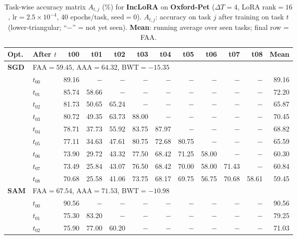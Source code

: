 \begin{table}[ht]
\centering
\caption{%
  Task-wise accuracy matrix $A_{t,j}$ (\%) for \textbf{IncLoRA} on \textbf{Oxford-Pet} ($\Delta T=4$, LoRA rank$=16$, lr$=2.5\times10^{-4}$, 40 epochs/task, seed$=0$).
  $A_{t,j}$: accuracy on task $j$ after training on task $t$  (lower-triangular; ``$-$'' = not yet seen).
  \textbf{Mean}: running average over seen tasks; final row = FAA.
}
\label{tab:raw_inclora_pets}
\setlength{\tabcolsep}{2.8pt}
\renewcommand{\arraystretch}{0.88}
\scriptsize
\begin{tabular}{@{}l l r r r r r r r r r r@{}}
\toprule
\textbf{Opt.} & \textbf{After $t$} & \textbf{t00} & \textbf{t01} & \textbf{t02} & \textbf{t03} & \textbf{t04} & \textbf{t05} & \textbf{t06} & \textbf{t07} & \textbf{t08} & \textbf{Mean} \\
\midrule
\multirow{10}{*}{\textbf{SGD}} & \multicolumn{11}{l}{\quad\small FAA$=59.45$,\; AAA$=64.32$,\; BWT$=-15.35$} \\
 & $t_{00}$ & 89.16 & $-$ & $-$ & $-$ & $-$ & $-$ & $-$ & $-$ & $-$ & 89.16 \\
 & $t_{01}$ & 85.74 & 58.66 & $-$ & $-$ & $-$ & $-$ & $-$ & $-$ & $-$ & 72.20 \\
 & $t_{02}$ & 81.73 & 50.65 & 65.24 & $-$ & $-$ & $-$ & $-$ & $-$ & $-$ & 65.87 \\
 & $t_{03}$ & 80.72 & 49.35 & 63.73 & 88.00 & $-$ & $-$ & $-$ & $-$ & $-$ & 70.45 \\
 & $t_{04}$ & 78.71 & 37.73 & 55.92 & 83.75 & 87.97 & $-$ & $-$ & $-$ & $-$ & 68.82 \\
 & $t_{05}$ & 77.11 & 34.63 & 47.61 & 80.75 & 72.68 & 80.75 & $-$ & $-$ & $-$ & 65.59 \\
 & $t_{06}$ & 73.90 & 29.72 & 43.32 & 77.50 & 68.42 & 71.25 & 58.00 & $-$ & $-$ & 60.30 \\
 & $t_{07}$ & 73.49 & 25.84 & 43.07 & 76.50 & 68.42 & 70.00 & 58.00 & 71.43 & $-$ & 60.84 \\
 & $t_{08}$ & 70.68 & 25.58 & 41.06 & 73.75 & 68.17 & 69.75 & 56.75 & 70.68 & 58.61 & 59.45 \\
\midrule
\multirow{10}{*}{\textbf{SAM}} & \multicolumn{11}{l}{\quad\small FAA$=67.54$,\; AAA$=71.53$,\; BWT$=-10.98$} \\
 & $t_{00}$ & 90.56 & $-$ & $-$ & $-$ & $-$ & $-$ & $-$ & $-$ & $-$ & 90.56 \\
 & $t_{01}$ & 75.30 & 83.20 & $-$ & $-$ & $-$ & $-$ & $-$ & $-$ & $-$ & 79.25 \\
 & $t_{02}$ & 75.90 & 77.00 & 60.20 & $-$ & $-$ & $-$ & $-$ & $-$ & $-$ & 71.03 \\

\end{tabular}
\end{table}
